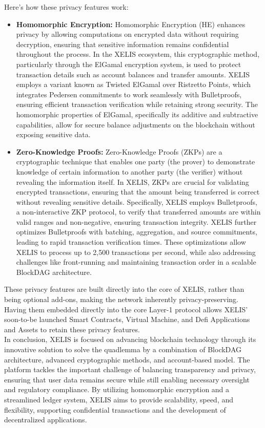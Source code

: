 \documentclass[12pt,a4paper,twocolumn]{article}
\begin{document}
Here's how these privacy features work:
\begin{itemize}
    \item \textbf{Homomorphic Encryption:} Homomorphic Encryption (HE) enhances privacy by allowing computations on encrypted data without requiring decryption, ensuring that sensitive information remains confidential throughout the process. In the XELIS ecosystem, this cryptographic method, particularly through the ElGamal encryption system, is used to protect transaction details such as account balances and transfer amounts. XELIS employs a variant known as Twisted ElGamal over Ristretto Points, which integrates Pedersen commitments to work seamlessly with Bulletproofs, ensuring efficient transaction verification while retaining strong security. The homomorphic properties of ElGamal, specifically its additive and subtractive capabilities, allow for secure balance adjustments on the blockchain without exposing sensitive data.

    \item \textbf{Zero-Knowledge Proofs:} Zero-Knowledge Proofs (ZKPs) are a cryptographic technique that enables one party (the prover) to demonstrate knowledge of certain information to another party (the verifier) without revealing the information itself. In XELIS, ZKPs are crucial for validating encrypted transactions, ensuring that the amount being transferred is correct without revealing sensitive details. Specifically, XELIS employs Bulletproofs, a non-interactive ZKP protocol, to verify that transferred amounts are within valid ranges and non-negative, ensuring transaction integrity. XELIS further optimizes Bulletproofs with batching, aggregation, and source commitments, leading to rapid transaction verification times. These optimizations allow XELIS to process up to 2,500 transactions per second, while also addressing challenges like front-running and maintaining transaction order in a scalable BlockDAG architecture.
\end{itemize}

These privacy features are built directly into the core of XELIS, rather than being optional add-ons, making the network inherently privacy-preserving. Having them embedded directly into the core Layer-1 protocol allows XELIS' soon-to-be launched Smart Contracts, Virtual Machine, and Defi Applications and Assets to retain these privacy features.\\

In conclusion, XELIS is focused on advancing blockchain technology through its innovative solution to solve the quadlemma by a combination of BlockDAG architecture, advanced cryptographic methods, and account-based model. The platform tackles the important challenge of balancing transparency and privacy, ensuring that user data remains secure while still enabling necessary oversight and regulatory compliance. By utilizing homomorphic encryption and a streamlined ledger system, XELIS aims to provide scalability, speed, and flexibility, supporting confidential transactions and the development of decentralized applications.\\
\end{document}
